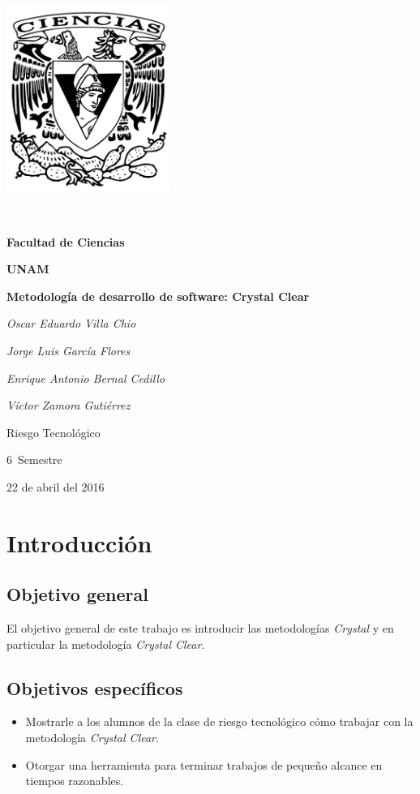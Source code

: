\documentclass[12pt,a4paper]{article}
\begin{document}
	
	\begin{titlepage}
		\centering
		\includegraphics[width=0.4\textwidth]{./images/logo_ciencias}\par\
		{\LARGE\bf Facultad de Ciencias \par}
		{\LARGE\bf UNAM \par}
		\vspace{1cm}
		{\huge\bfseries Metodolog\'ia de desarrollo de software: Crystal Clear\par}
		\vspace{2cm}
		{\Large\itshape Oscar Eduardo Villa Chio\par}
		{\Large\itshape Jorge Luis Garc\'ia Flores\par}
		{\Large\itshape Enrique Antonio Bernal Cedillo\par}
		{\Large\itshape V\'ictor Zamora Guti\'errez\par}
		\vspace{0.5cm}
		{\large Riesgo Tecnol\'ogico\par 6\textdegree \ Semestre\par}
		{\large 22 de abril del 2016}
	\end{titlepage}
	
	\section{Introducci\'on}
	
	\subsection{Objetivo general}
	El objetivo general de este trabajo es introducir las metodolog\'ias {\itshape Crystal} y en particular la metodolog\'ia {\itshape Crystal Clear}.
	
	\subsection{Objetivos espec\'ificos}
	\begin{itemize}
		\item Mostrarle a los alumnos de la clase de riesgo tecnol\'ogico c\'omo trabajar con la metodolog\'ia {\itshape Crystal Clear}.
		
		\item Otorgar una herramienta para terminar trabajos de peque\~no alcance en tiempos razonables.
	\end{itemize}
	
\end{document}
